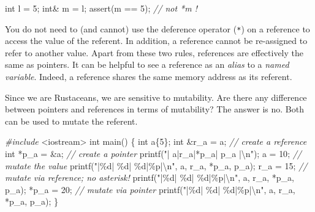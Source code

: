 \documentclass[
]{book}
\newenvironment{Shaded}{\begin{snugshade}}{\end{snugshade}}
\newcommand{\CommentTok}[1]{\textcolor[rgb]{0.56,0.35,0.01}{\textit{#1}}}
\newcommand{\DataTypeTok}[1]{\textcolor[rgb]{0.13,0.29,0.53}{#1}}
\newcommand{\DecValTok}[1]{\textcolor[rgb]{0.00,0.00,0.81}{#1}}
\newcommand{\ImportTok}[1]{#1}
\newcommand{\NormalTok}[1]{#1}
\newcommand{\OtherTok}[1]{\textcolor[rgb]{0.56,0.35,0.01}{#1}}
\newcommand{\PreprocessorTok}[1]{\textcolor[rgb]{0.56,0.35,0.01}{\textit{#1}}}
\newcommand{\SpecialCharTok}[1]{\textcolor[rgb]{0.00,0.00,0.00}{#1}}
\newcommand{\StringTok}[1]{\textcolor[rgb]{0.31,0.60,0.02}{#1}}
\begin{document}
\begin{Shaded}
\begin{Highlighting}[]
\DataTypeTok{int}\NormalTok{ l = }\DecValTok{5}\NormalTok{;}
\DataTypeTok{int}\NormalTok{\& m = l;}
\OtherTok{assert}\NormalTok{(m == }\DecValTok{5}\NormalTok{); }\CommentTok{// not \textasciigrave{}*m\textasciigrave{} !}
\end{Highlighting}
\end{Shaded}

You do not need to (and cannot) use the deference operator (\texttt{*}) on a reference to access the value of the referent. In addition, a reference cannot be re-assigned to refer to another value. Apart from these two rules, references are effectively the same as pointers. It can be helpful to see a reference as an \emph{alias} to a \emph{named variable}. Indeed, a reference shares the same memory address as its referent.

Since we are Rustaceans, we are sensitive to mutability. Are there any difference between pointers and references in terms of mutability? The answer is no. Both can be used to mutate the referent.

\begin{Shaded}
\begin{Highlighting}[]
\PreprocessorTok{\#include }\ImportTok{\textless{}iostream\textgreater{}}
\DataTypeTok{int}\NormalTok{ main()}
\NormalTok{\{}
    \DataTypeTok{int}\NormalTok{ a\{}\DecValTok{5}\NormalTok{\};}
    \DataTypeTok{int}\NormalTok{ \&r\_a = a;  }\CommentTok{// create a reference}
    \DataTypeTok{int}\NormalTok{ *p\_a = \&a; }\CommentTok{// create a pointer}
\NormalTok{    printf(}\StringTok{"| a|r\_a|*p\_a|     p\_a      |}\SpecialCharTok{\textbackslash{}n}\StringTok{"}\NormalTok{);}
\NormalTok{    a = }\DecValTok{10}\NormalTok{; }\CommentTok{// mutate the value}
\NormalTok{    printf(}\StringTok{"|}\SpecialCharTok{\%d}\StringTok{| }\SpecialCharTok{\%d}\StringTok{|  }\SpecialCharTok{\%d}\StringTok{|}\SpecialCharTok{\%p}\StringTok{|}\SpecialCharTok{\textbackslash{}n}\StringTok{"}\NormalTok{, a, r\_a, *p\_a, p\_a);}
\NormalTok{    r\_a = }\DecValTok{15}\NormalTok{; }\CommentTok{// mutate via reference; no asterisk!}
\NormalTok{    printf(}\StringTok{"|}\SpecialCharTok{\%d}\StringTok{| }\SpecialCharTok{\%d}\StringTok{|  }\SpecialCharTok{\%d}\StringTok{|}\SpecialCharTok{\%p}\StringTok{|}\SpecialCharTok{\textbackslash{}n}\StringTok{"}\NormalTok{, a, r\_a, *p\_a, p\_a);}
\NormalTok{    *p\_a = }\DecValTok{20}\NormalTok{; }\CommentTok{// mutate via pointer}
\NormalTok{    printf(}\StringTok{"|}\SpecialCharTok{\%d}\StringTok{| }\SpecialCharTok{\%d}\StringTok{|  }\SpecialCharTok{\%d}\StringTok{|}\SpecialCharTok{\%p}\StringTok{|}\SpecialCharTok{\textbackslash{}n}\StringTok{"}\NormalTok{, a, r\_a, *p\_a, p\_a);}
\NormalTok{\}}
\end{Highlighting}
\end{Shaded}
\end{document}
